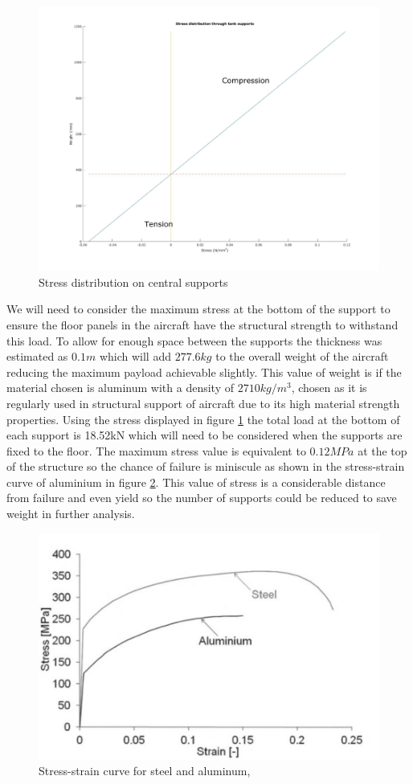 \begin{figure}[!htbp]
\centering
\includegraphics[width= 0.8\linewidth]{../figures/stress_distribution_on_central_supports.jpg}
\caption{Stress distribution on central supports}
  \label{fig:stress_distribution_on_central_supports}
\end{figure}
\FloatBarrier

We will need to consider the maximum stress at the bottom of the support to ensure the floor panels in the aircraft have the structural strength to withstand this load. To allow for enough space between the supports the thickness was estimated as $0.1m$ which will add $277.6kg$ to the overall weight of the aircraft reducing the maximum payload achievable slightly. This value of weight is if the material chosen is aluminum with a density of $2710kg/m^3$, chosen as it is regularly used in structural support of aircraft due to its high material strength properties.
Using the stress displayed in figure \ref{fig:stress_distribution_on_central_supports} the total load at the bottom of each support is 18.52kN which will need to be considered when the supports are fixed to the floor.
The maximum stress value is equivalent to $0.12 MPa$ at the top of the structure so the chance of failure is miniscule as shown in the stress-strain curve of aluminium in figure \ref{fig:stress_strain_steel_al}. This value of stress is a considerable distance from failure and even yield so the number of supports could be reduced to save weight in further analysis. 

\begin{figure}[!htbp]
\centering
\includegraphics[width= 0.8\linewidth]{../figures/stress_strain_steel_al.jpg}
  \caption{Stress-strain curve for steel and aluminum, \cite{liu2013failure}}
  \label{fig:stress_strain_steel_al}
\end{figure}
\FloatBarrier

